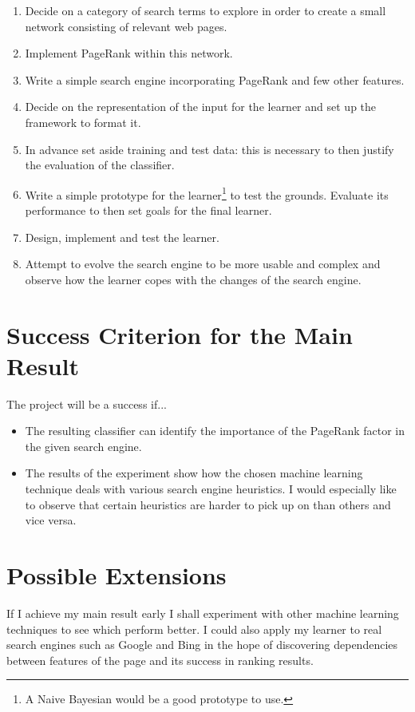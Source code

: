 \begin{enumerate}
\item Decide on a category of search terms to explore in order to create a small network consisting of relevant web pages.

\item Implement PageRank within this network. 

\item Write a simple search engine incorporating PageRank and few other features. 

\item Decide on the representation of the input for the learner and set up the framework to format it. 

\item In advance set aside training and test data: this is necessary to then justify the evaluation of the classifier.

\item Write a simple prototype for the learner\footnote {A Naive Bayesian would be a good prototype to use.} to test the grounds. Evaluate its performance to then set goals for the final learner.  

\item Design, implement and test the learner. 

\item Attempt to evolve the search engine to be more usable and complex and observe how the learner copes with the changes of the search engine. 


\end{enumerate}

\section*{\bf Success Criterion for the Main Result}


The project will be a success if... 
\begin{itemize}
\item The resulting classifier can identify the importance of the PageRank factor in the given search engine.
\item The results of the experiment show how the chosen machine learning technique deals with various search engine heuristics. I would especially like to observe that certain heuristics are harder to pick up on than others and vice versa.
\end{itemize}
\section*{\bf Possible Extensions}
If I achieve my main result early I shall experiment with other machine learning techniques to see which perform better. I could also apply my learner to real search engines such as Google and Bing in the hope of 
discovering dependencies between features of the page and its success in ranking results.
